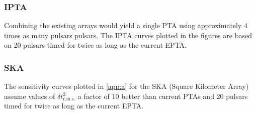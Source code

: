 \subsubsection{IPTA}
Combining the existing arrays would yield a single PTA using approximately 4 times as many pulsars pulsars. The IPTA curves plotted in the figures are based on 20 pulsars timed for twice as long as the current EPTA.

\subsubsection{SKA}
The sensitivity curves plotted in \ref{app:a} for the SKA (Square Kilometer Array) assume values of $\delta t^{2}_{\mathrm{r.m.s.}}$ a factor of 10 better than current PTAs and 20 pulsars timed for twice as long as the current EPTA.

